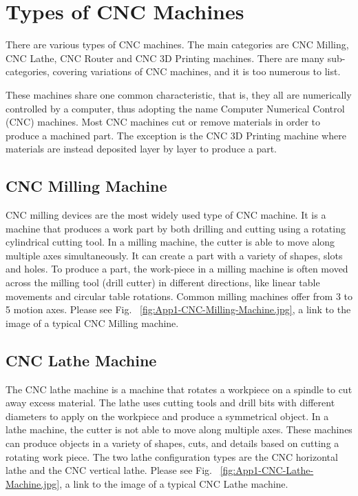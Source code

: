 
\section{Types of CNC Machines}

There are various types of CNC machines. The main categories are CNC Milling, CNC Lathe, CNC Router and CNC 3D Printing machines. There are many sub-categories, covering variations of CNC machines, and it is too numerous to list. 
\vspace*{1\baselineskip}

These machines share one common characteristic, that is, they all are numerically controlled by a computer, thus adopting the name Computer Numerical Control (CNC) machines. Most CNC machines cut or remove materials in order to produce a machined part. The exception is the CNC 3D Printing machine where materials are instead deposited layer by layer to produce a part.

\subsection{CNC Milling Machine}

CNC milling devices are the most widely used type of CNC machine. It is a machine that produces a work part by both drilling and cutting using a rotating cylindrical cutting tool. In a milling machine, the cutter is able to move along multiple axes simultaneously. It can create a part with a variety of shapes, slots and holes. To produce a part, the work-piece in a milling machine is often moved across the milling tool (drill cutter) in different directions, like linear table movements and circular table rotations.  Common milling machines offer from 3 to 5 motion axes. Please see Fig. ~\ref{fig:App1-CNC-Milling-Machine.jpg}, a link to the image of a typical CNC Milling machine.

\subsection{CNC Lathe Machine}

The CNC lathe machine is a machine that rotates a workpiece on a spindle to cut away excess material. The lathe uses cutting tools and drill bits with different diameters to apply on the workpiece and produce a symmetrical object. In a lathe machine, the cutter is not able to move along multiple axes. These machines can produce objects in a variety of shapes, cuts, and details based on cutting a rotating work piece. The two lathe configuration types are the CNC horizontal lathe and the CNC vertical lathe. Please see Fig. ~\ref{fig:App1-CNC-Lathe-Machine.jpg}, a link to the image of a typical CNC Lathe machine.

